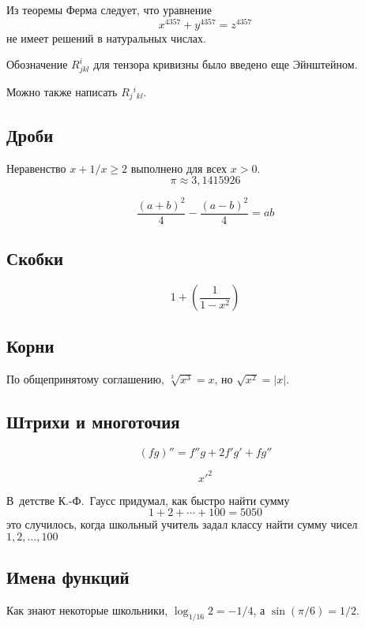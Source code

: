 \documentclass{article}
\begin{document}
Из теоремы Ферма следует, что уравнение
\[
x^{4357}+y^{4357}=z^{4357}
\]
не имеет решений в натуральных числах.

Обозначение $R^i_{jkl}$ для тензора кривизны было введено еще Эйнштейном.

Можно также написать $R_j{}^i{}_{kl}$.

\subsection{Дроби}
Неравенство $x+1/x\ge 2$ выполнено для всех $x>0$.
\[
\pi\approx 3{,}1415926
\]

\[
\frac{(a+b)^2}{4}-
\frac{(a-b)^2}{4}=
ab
\]

\subsection{Скобки}
\[
1+\left(\frac{1}{1-x^2}\right)
\]

\subsection{Корни}
По общепринятому соглашению, $\sqrt[3]{x^3}=x$, но $\sqrt{x^2}=|x|$.

\subsection{Штрихи и многоточия}
\[
(fg)''=f''g+2f'g'+fg''
\]

\[
{x'}^2
\]

В~детстве К.-Ф.~Гаусс придумал, как быстро найти сумму
\[
1+2+\cdots+100=5050
\]
это случилось, когда школьный учитель задал классу найти сумму чисел $1,2,\ldots,100$ 

\subsection{Имена функций}
Как знают некоторые школьники, $\log_{1/16}2=-1/4$, а $\sin(\pi/6)=1/2$.
\end{document}
